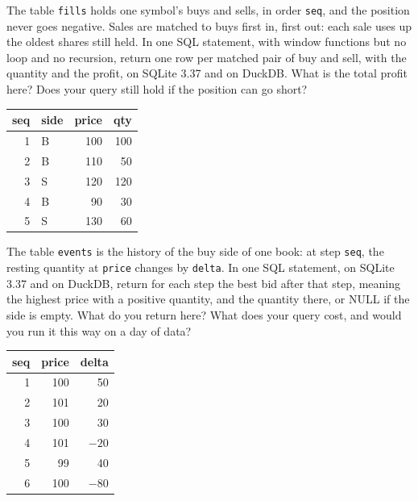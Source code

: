 \begin{question}\label{iq:iv3:sql-and-data:24}
The table \texttt{fills} holds one symbol's buys and sells, in order \texttt{seq}, and the position never goes negative. Sales are matched to buys first in, first out: each sale uses up the oldest shares still held. In one SQL statement, with window functions but no loop and no recursion, return one row per matched pair of buy and sell, with the quantity and the profit, on SQLite 3.37 and on DuckDB. What is the total profit here? Does your query still hold if the position can go short?
\begin{center}\small
\begin{tabular}{rlrr}
seq & side & price & qty\\\hline
1 & B & 100 & 100\\
2 & B & 110 & 50\\
3 & S & 120 & 120\\
4 & B & 90 & 30\\
5 & S & 130 & 60
\end{tabular}
\end{center}
\end{question}

\begin{question}\label{iq:iv3:sql-and-data:25}
The table \texttt{events} is the history of the buy side of one book: at step \texttt{seq}, the resting quantity at \texttt{price} changes by \texttt{delta}. In one SQL statement, on SQLite 3.37 and on DuckDB, return for each step the best bid after that step, meaning the highest price with a positive quantity, and the quantity there, or NULL if the side is empty. What do you return here? What does your query cost, and would you run it this way on a day of data?
\begin{center}\small
\begin{tabular}{rrr}
seq & price & delta\\\hline
1 & 100 & 50\\
2 & 101 & 20\\
3 & 100 & 30\\
4 & 101 & $-20$\\
5 & 99 & 40\\
6 & 100 & $-80$
\end{tabular}
\end{center}
\end{question}
